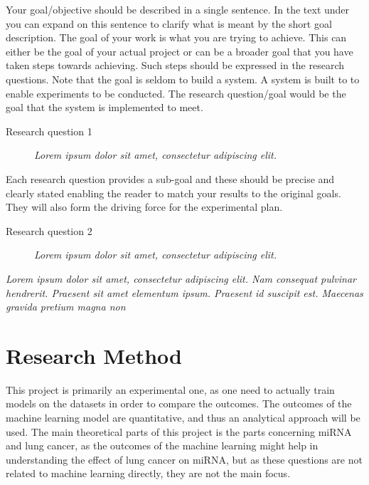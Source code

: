 Your goal/objective should be described in a single sentence. In the text under you can expand on this sentence to clarify what is meant by the short goal description. 
The goal of your work is what you are trying to achieve. This can either be the goal of your actual project or can be a broader goal that you have taken steps towards achieving. Such steps should be expressed in the research questions. 
Note that the goal is seldom to build a system. A system is built to to enable experiments to be conducted. The research question/goal would be the goal that the system is implemented to meet.  


\begin{description}
\item[Research question 1] {\it Lorem ipsum dolor sit amet, consectetur adipiscing elit.}
\end{description}

Each research question provides a sub-goal and these should be precise and clearly stated enabling the reader to match your results to the original goals. They will also form the driving force for the experimental plan. 

\begin{description}
\item[Research question 2] {\it Lorem ipsum dolor sit amet, consectetur adipiscing elit.}
\end{description}

{\it Lorem ipsum dolor sit amet, consectetur adipiscing elit. Nam consequat pulvinar hendrerit. Praesent sit amet elementum ipsum. Praesent id suscipit est. Maecenas gravida pretium magna non }
\fi

\section{Research Method}
\label{sec:researchMethod}

This project is primarily an experimental one, as one need to actually train models on the datasets in order to compare the outcomes. The outcomes of the machine learning model are quantitative, and thus an analytical approach will be used. The main theoretical parts of this project is the parts concerning miRNA and lung cancer, as the outcomes of the machine learning might help in understanding the effect of lung cancer on miRNA, but as these questions are not related to machine learning directly, they are not the main focus.
\iffalse
What methodology will you apply to address the goals: theoretic/analytic, model/abstraction or design/experiment? This section will describe the research methodology applied and the reason for this choice of research methodology.  
\fi


